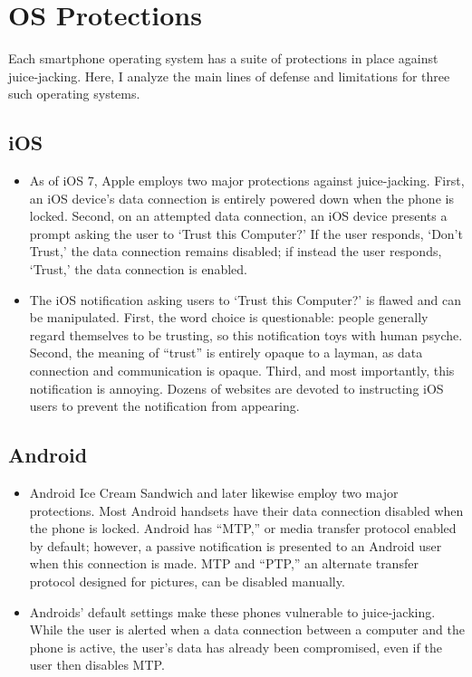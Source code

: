 \documentclass[11pt]{article} %
\begin{document}
\section{OS Protections} 

Each smartphone operating system has a suite of protections in place against juice-jacking. Here, I analyze the main lines of defense and limitations for three such operating systems. 

\subsection{iOS} 

\begin{itemize}
\item As of iOS 7, Apple employs two major protections against juice-jacking. First, an iOS device's data connection is entirely powered down when the phone is locked. Second, on an attempted data connection, an iOS device presents a prompt asking the user to `Trust this Computer?' If the user responds, `Don't Trust,' the data connection remains disabled; if instead the user responds, `Trust,' the data connection is enabled. 

\item The iOS notification asking users to `Trust this Computer?' is flawed and can be  manipulated. First, the word choice is questionable: people generally regard themselves to be trusting, so this notification toys with human psyche. Second, the meaning of ``trust'' is entirely opaque to a layman, as data connection and communication is opaque. Third, and most importantly, this notification is annoying. Dozens of websites are devoted to instructing iOS users to prevent the notification from appearing. 
\end{itemize} 

\subsection{Android} 

\begin{itemize}
\item Android Ice Cream Sandwich and later likewise employ two major protections. Most Android handsets have their data connection disabled when the phone is locked. Android has ``MTP,'' or media transfer protocol enabled by default; however, a passive notification is presented to an Android user when this connection is made. MTP and ``PTP,'' an alternate transfer protocol designed for pictures, can be disabled manually. 

\item Androids' default settings make these phones vulnerable to juice-jacking. While the user is alerted when a data connection between a computer and the phone is active, the user's data has already been compromised, even if the user then disables MTP. 
\end{itemize} 
\end{document}

